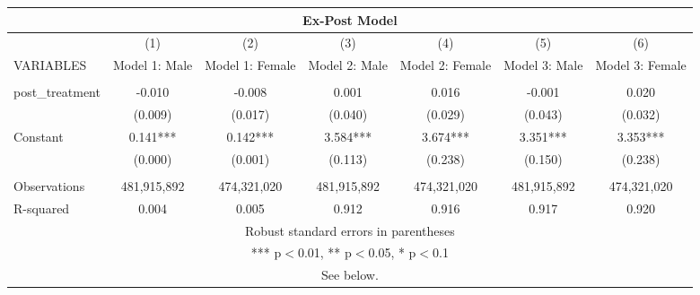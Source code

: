 \begin{tabular}{lcccccc}
\multicolumn{7}{c}{Ex-Post Model} \\ \hline
 & (1) & (2) & (3) & (4) & (5) & (6) \\
VARIABLES & Model 1: Male & Model 1: Female & Model 2: Male & Model 2: Female & Model 3: Male & Model 3: Female \\ \hline
 &  &  &  &  &  &  \\
post\_treatment & -0.010 & -0.008 & 0.001 & 0.016 & -0.001 & 0.020 \\
 & (0.009) & (0.017) & (0.040) & (0.029) & (0.043) & (0.032) \\
Constant & 0.141*** & 0.142*** & 3.584*** & 3.674*** & 3.351*** & 3.353*** \\
 & (0.000) & (0.001) & (0.113) & (0.238) & (0.150) & (0.238) \\
 &  &  &  &  &  &  \\
Observations & 481,915,892 & 474,321,020 & 481,915,892 & 474,321,020 & 481,915,892 & 474,321,020 \\
 R-squared & 0.004 & 0.005 & 0.912 & 0.916 & 0.917 & 0.920 \\ \hline
\multicolumn{7}{c}{ Robust standard errors in parentheses} \\
\multicolumn{7}{c}{ *** p$<$0.01, ** p$<$0.05, * p$<$0.1} \\
\multicolumn{7}{c}{ See below.} \\
\end{tabular}
